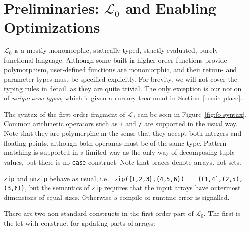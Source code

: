 \documentclass{sigplanconf}  %
\newcommand{\LO}{$\mathcal{L}_0$}
\begin{document}

\section{Preliminaries: $\mathcal{L}_0$ and Enabling Optimizations}
\label{sec:Prelim}

\LO{} is a mostly-monomorphic, statically typed, strictly evaluated,
purely functional language.  Although some built-in higher-order
functions provide polymorphism, user-defined functions are
monomorphic, and their return- and parameter types must be specified
explicitly.  For brevity, we will not cover the typing
rules in detail, as they are quite trivial.  The only exception is our
notion of {\em uniqueness types}, which is given a cursory treatment
in Section~\ref{sec:in-place}.

The syntax of the first-order fragment of \LO{} can be seen in Figure~\ref{fig:fo-syntax}.  
Common arithmetic operators such as {\tt +} and
{\tt /} are supported in the usual way.  Note that they are
polymorphic in the sense that they accept both integers and
floating-points, although both operands must be of the same type.
Pattern matching is supported in a limited way as the only way of
decomposing tuple values, but there is no {\tt case} construct.  
Note that braces denote arrays, not sets.

{\tt zip} and {\tt unzip} behave as usual, i.e, {\tt
  zip(\{1,2,3\},\{4,5,6\})} $=$ {\tt \{{(1,4),(2,5),(3,6)}\}}, but the
semantics of {\tt zip} requires that the input arrays have outermost
dimensions of equal sizes. Otherwise a compile or runtime error is signalled.

There are two non-standard constructs in the first-order part  %
of \LO{}.  The first is the let-with construct for updating parts of
arrays:
\end{document}
